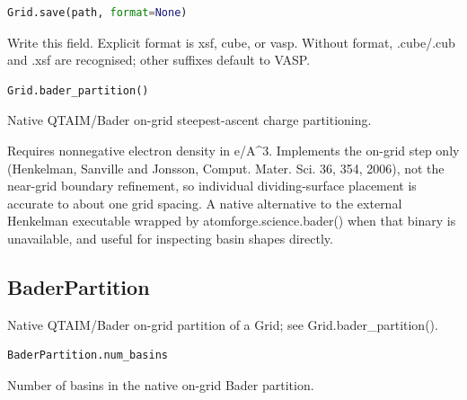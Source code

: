 \begin{samepage}

\begin{lstlisting}[language=Python]
Grid.save(path, format=None)
\end{lstlisting}

Write this field. Explicit format is xsf, cube, or vasp. Without format, .cube/\allowbreak{}.cub and .xsf are recognised; other suffixes default to VASP.

\end{samepage}



\begin{samepage}

\begin{lstlisting}[language=Python]
Grid.bader_partition()
\end{lstlisting}

Native QTAIM/\allowbreak{}Bader on-grid steepest-ascent charge partitioning.

Requires nonnegative electron density in e/\allowbreak{}A\textasciicircum{}3. Implements the
on-grid step only (Henkelman, Sanville and Jonsson, Comput. Mater.
Sci. 36, 354, 2006), not the near-grid boundary refinement, so
individual dividing-surface placement is accurate to about one grid
spacing. A native alternative to the external Henkelman executable
wrapped by atomforge.science.bader() when that binary is
unavailable, and useful for inspecting basin shapes directly.

\end{samepage}



\subsection{BaderPartition}

Native QTAIM/\allowbreak{}Bader on-grid partition of a Grid; see Grid.bader\_\allowbreak{}partition().

\begin{samepage}

\begin{lstlisting}[language=Python]
BaderPartition.num_basins
\end{lstlisting}

Number of basins in the native on-grid Bader partition.

\end{samepage}




